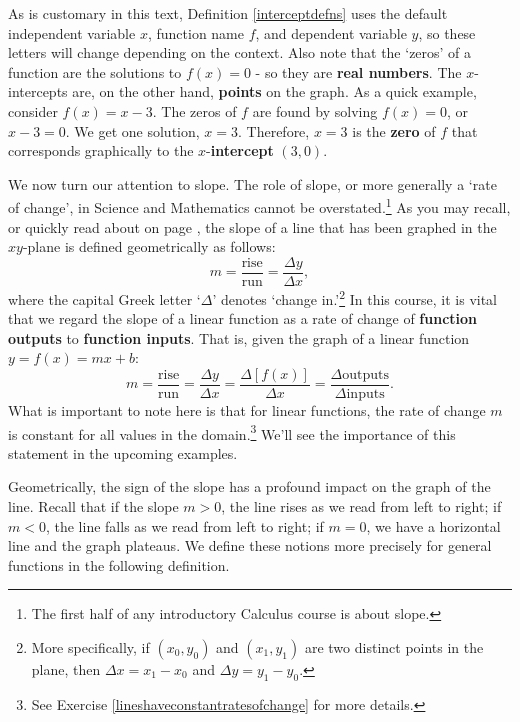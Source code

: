 \documentclass{ximera}
\begin{document}
As is customary in this text, Definition \ref{interceptdefns} uses the default independent variable $x$, function name $f$, and dependent variable $y$, so these letters will change depending on the context.  Also note that the `zeros' of a function are the solutions to $f(x) = 0$ - so they are \textbf{real numbers}.  The $x$-intercepts are, on the other hand, \textbf{points} on the graph.  As a quick example, consider $f(x) = x-3$.  The zeros of $f$ are found by solving $f(x) = 0$, or $x-3=0$.  We get one solution, $x = 3$.  Therefore, $x=3$ is the \textbf{zero} of $f$ that corresponds graphically to the $x$-\textbf{intercept} $(3,0)$.  



We now turn our attention to slope.  The role of slope, or more generally a `rate of change',  in Science and Mathematics  cannot be overstated.\footnote{The first half of any introductory Calculus course is about slope.} As you may recall, or quickly read about on page \pageref{slope}, the slope of a line that has been graphed in the $xy$-plane is defined geometrically as follows: \[m = \dfrac{\text{rise}}{\text{run}} = \dfrac{\Delta y}{\Delta x} ,\] where the capital Greek letter  `$\Delta$' denotes `change in.'\footnote{More specifically, if $(x_{0}, y_{0})$ and $(x_{1}, y_{1})$ are two distinct points in the plane, then $\Delta x = x_{1} - x_{0}$ and $\Delta y = y_{1} - y_{0}$.} In this course, it is vital that we regard the slope of a linear function as a  rate of change of \textbf{function outputs}  to \textbf{function inputs}.  That is, given the graph of a linear function $y = f(x) = mx + b$:   \[ m = \dfrac{\text{rise}}{\text{run}} = \dfrac{\Delta y}{\Delta x} = \dfrac{\Delta [f(x)]}{\Delta x} = \dfrac{\Delta \text{outputs}}{\Delta \text{inputs}}. \]  What is important to note here is that for linear functions, the rate of change $m$ is constant for all values in the domain.\footnote{See Exercise \ref{lineshaveconstantratesofchange} for more details.}  We'll see the importance of this statement in the upcoming examples.



Geometrically, the sign of the slope has a profound impact on the graph of the line.  Recall that if the slope $m > 0$, the line rises as we read from left to right;   if $m<0$, the line falls as we read from left to right; if $m=0$, we have a horizontal line and the graph plateaus.  We define these notions more precisely for general functions in the following definition.
\end{document}
